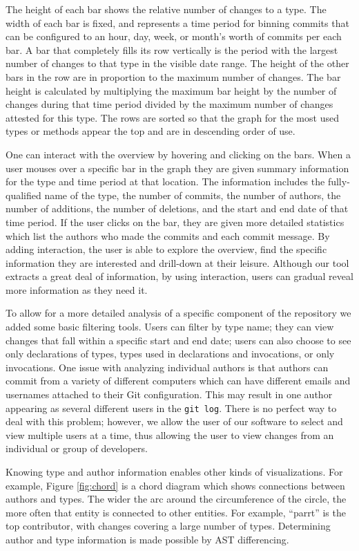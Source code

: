 The height of each bar shows the relative number of changes to a type. The width of each bar is fixed, and represents a time period for binning commits that can be configured to an hour, day, week, or month's worth of commits per each bar.  A bar that completely fills its row vertically is the period with the largest number of changes to that type in the visible date range. The height of the other bars in the row are in proportion to the maximum number of changes. The bar height is calculated by multiplying the maximum bar height by the number of changes during that time period divided by the maximum number of changes attested for this type. The rows are sorted so that the graph for the most used types or methods appear the top and are in descending order of use.

One can interact with the overview by hovering and clicking on the bars. When a user mouses over a specific bar in the graph they are given summary information for the type and time period at that location. The information includes the fully-qualified name of the type, the number of commits, the number of authors, the number of additions, the number of deletions, and the start and end date of that time period. If the user clicks on the bar, they are given more detailed statistics which list the authors who made the commits and each commit message. By adding interaction, the user is able to explore the overview, find the specific information they are interested and drill-down at their leisure. Although our tool extracts a great deal of information, by using interaction, users can gradual reveal more information as they need it.

To allow for a more detailed analysis of a specific component of the repository we added some basic filtering tools. Users can filter by type name; they can view changes that fall within a specific start and end date; users can also choose to see only declarations of types, types used in declarations and invocations, or only invocations. One issue with analyzing individual authors is that authors can commit from a variety of different computers which can have different emails and usernames attached to their Git configuration. This may result in one author appearing as several different users in the \texttt{git log}. There is no perfect way to deal with this problem; however, we allow the user of our software to select and view multiple users at a time, thus allowing the user to view changes from an individual or group of developers.

Knowing type and author information enables other kinds of visualizations. For example, Figure \ref{fig:chord} is a chord diagram which shows connections between authors and types. The wider the arc around the circumference of the circle, the more often that entity is connected to other entities. For example, ``parrt'' is the top contributor, with changes covering a large number of types. Determining author and type information is made possible by AST differencing.

